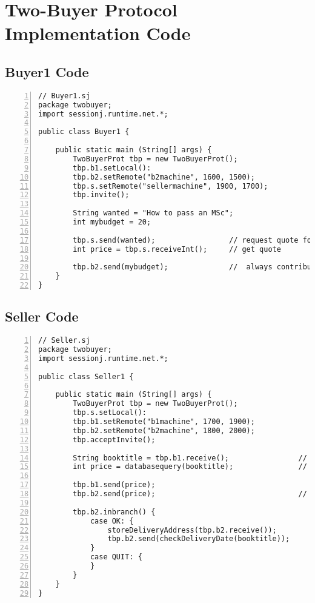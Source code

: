 \appendix
\addappheadtotoc


\chapter{Two-Buyer Protocol Implementation Code}
\label{appendixA}

\section*{Buyer1 Code}

\begin{lstlisting}[basicstyle=\LISTINGSTYLE, numbers=left]
// Buyer1.sj
package twobuyer; 
import sessionj.runtime.net.*;
 
public class Buyer1 {
	
	public static main (String[] args) {
		TwoBuyerProt tbp = new TwoBuyerProt();
		tbp.b1.setLocal():
		tbp.b2.setRemote("b2machine", 1600, 1500);
		tbp.s.setRemote("sellermachine", 1900, 1700);
		tbp.invite();
		
		String wanted = "How to pass an MSc";
		int mybudget = 20;
		
		tbp.s.send(wanted); 				// request quote for wanted book
		int price = tbp.s.receiveInt();		// get quote
			
		tbp.b2.send(mybudget);				//	always contribute with entire budget			
	} 
}
\end{lstlisting}


\section*{Seller Code}

\begin{lstlisting}[basicstyle=\LISTINGSTYLE, numbers=left]
// Seller.sj
package twobuyer; 
import sessionj.runtime.net.*;
 
public class Seller1 {
	
	public static main (String[] args) {
		TwoBuyerProt tbp = new TwoBuyerProt();
		tbp.s.setLocal():
		tbp.b1.setRemote("b1machine", 1700, 1900);
		tbp.b2.setRemote("b2machine", 1800, 2000);
		tbp.acceptInvite();
		
		String booktitle = tbp.b1.receive(); 				// request quote for wanted book
		int price = databasequery(booktitle);				// query own database for price 
				
		tbp.b1.send(price);	
		tbp.b2.send(price);									//	send price to both participants
					
		tbp.b2.inbranch() {
			case OK: {
				storeDeliveryAddress(tbp.b2.receive());			// store delivery address in order				
				tbp.b2.send(checkDeliveryDate(booktitle));		// check delivery date of item
			}
			case QUIT: {
			}
		}
	}							
}
\end{lstlisting}